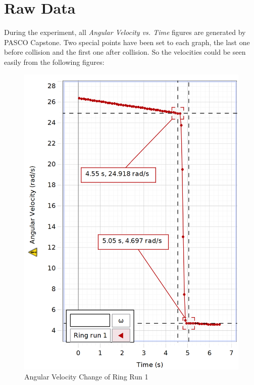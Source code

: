 \section{Raw Data}\label{sec:raw}
During the experiment, all \emph{Angular Velocity vs. Time} figures are generated by PASCO Capstone\texttrademark. Two special points have been set to each graph, the last one before collision and the first one after collision. So the velocities could be seen easily from the following figures:
\begin{figure}[H]
  \centering\includegraphics[width=15cm]{figRingRun1.png}
  \caption{Angular Velocity Change of Ring Run 1}
  \label{fig:RingRun1}
\end{figure}
